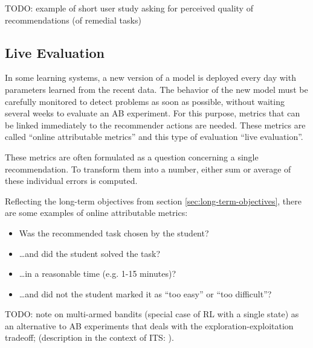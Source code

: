 TODO: example of short user study asking for perceived quality of recommendations
(of remedial tasks) \cite{learner-models-integration-skills}

\subsection{Live Evaluation}
\label{sec:live-evaluation}

In some learning systems, a new version of a model is deployed every day
  with parameters learned from the recent data.
The behavior of the new model must be carefully monitored
  to detect problems as soon as possible,
  without waiting several weeks to evaluate an AB experiment.
For this purpose, metrics that can be linked immediately
  to the recommender actions are needed.
These metrics are called ``online attributable metrics''  %
and this type of evaluation ``live evaluation''.

These metrics are often formulated as a question concerning a single recommendation.
To transform them into a number, either sum or average of these individual errors is computed.

Reflecting the long-term objectives from section \ref{sec:long-term-objectives},
  there are some examples of online attributable metrics:
\begin{itemize}
  \item Was the recommended task chosen by the student?
  \item \ldots and did the student solved the task?
  \item \ldots in a reasonable time (e.g. 1-15 minutes)?
  \item \ldots and did not the student marked it as ``too easy'' or ``too difficult''?
\end{itemize}




TODO: note on multi-armed bandits (special case of RL with a single state) as
an alternative to AB experiments that deals with the exploration-exploitation
tradeoff; (description in the context of ITS: \cite[p.129]{its-domain-models}).

